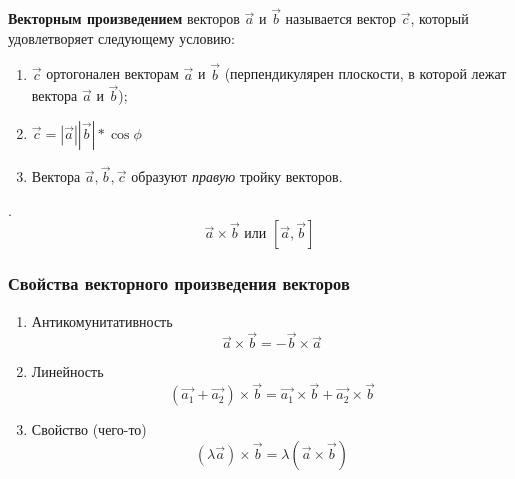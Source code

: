 \begin{definition}
  \textbf{Векторным произведением} векторов $\vec{a}$ и $\vec{b}$ называется вектор $\vec{c}$, который удовлетворяет следующему условию:
  \begin{enumerate}
    \item $\vec{c}$ ортогонален векторам $\vec{a}$ и $\vec{b}$ (перпендикулярен плоскости, в которой лежат вектора $\vec{a}$ и $\vec{b}$);
    \item $\vec{c} = |\vec{a}| |\vec{b}| * \cos \phi$
    \item Вектора $\vec{a}, \vec{b}, \vec{c}$ образуют \textit{правую} тройку векторов. 
  \end{enumerate}.
  \[
    \vec{a} \times \vec{b} \text{ или } [\vec{a}, \vec{b}]
  \] 
\end{definition}

\subsubsection{Свойства векторного произведения векторов}

\begin{enumerate}
  \item Антикомунитативность \[
    \vec{a} \times \vec{b} = - \vec{b} \times \vec{a}
  \] 
  \item Линейность \[
    \left( \vec{a_1} + \vec{a_2} \right) \times \vec{b} = \vec{a_1} \times \vec{b} + \vec{a_2} \times  \vec{b} 
  \]  
  \item Свойство (чего-то) \[
    \left( \lambda \vec{a} \right) \times \vec{b} = \lambda \left( \vec{a} \times \vec{b} \right)  
  \]
\end{enumerate}

